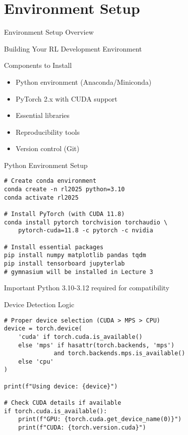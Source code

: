 \documentclass[aspectratio=169,10pt]{beamer}
\begin{document}
\section{Environment Setup}

\begin{frame}{Environment Setup Overview}
\begin{center}
\Large{Building Your RL Development Environment}
\end{center}

\begin{block}{Components to Install}
\begin{itemize}
    \item Python environment (Anaconda/Miniconda)
    \item PyTorch 2.x with CUDA support
    \item Essential libraries
    \item Reproducibility tools
    \item Version control (Git)
\end{itemize}
\end{block}
\end{frame}

\begin{frame}[fragile]{Python Environment Setup}
\begin{lstlisting}
# Create conda environment
conda create -n rl2025 python=3.10
conda activate rl2025

# Install PyTorch (with CUDA 11.8)
conda install pytorch torchvision torchaudio \
    pytorch-cuda=11.8 -c pytorch -c nvidia

# Install essential packages
pip install numpy matplotlib pandas tqdm
pip install tensorboard jupyterlab
# gymnasium will be installed in Lecture 3
\end{lstlisting}

\begin{alertblock}{Important}
Python 3.10-3.12 required for compatibility
\end{alertblock}
\end{frame}

\begin{frame}[fragile]{Device Detection Logic}
\begin{lstlisting}
# Proper device selection (CUDA > MPS > CPU)
device = torch.device(
    'cuda' if torch.cuda.is_available() 
    else 'mps' if hasattr(torch.backends, 'mps') 
              and torch.backends.mps.is_available()
    else 'cpu'
)

print(f"Using device: {device}")

# Check CUDA details if available
if torch.cuda.is_available():
    print(f"GPU: {torch.cuda.get_device_name(0)}")
    print(f"CUDA: {torch.version.cuda}")
\end{lstlisting}
\end{frame}
\end{document}
